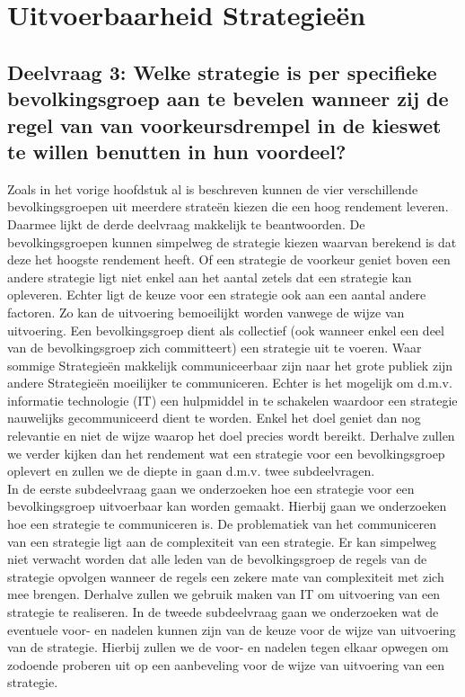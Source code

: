 \newpage
\section{Uitvoerbaarheid Strategie\"{e}n}
\label{h6}

\subsection*{Deelvraag 3: Welke strategie is per specifieke bevolkingsgroep aan te bevelen wanneer zij de regel van van voorkeursdrempel in de kieswet te willen benutten in hun voordeel?}
Zoals in het vorige hoofdstuk al is beschreven kunnen de vier verschillende bevolkingsgroepen uit meerdere strate\"{e}n kiezen die een hoog rendement leveren. Daarmee lijkt de derde deelvraag makkelijk te beantwoorden. De bevolkingsgroepen kunnen simpelweg de strategie kiezen waarvan berekend is dat deze het hoogste rendement heeft. Of een strategie de voorkeur geniet boven een andere strategie ligt niet enkel aan het aantal zetels dat een strategie kan opleveren. Echter ligt de keuze voor een strategie ook aan een aantal andere factoren. Zo kan de uitvoering bemoeilijkt worden vanwege de wijze van uitvoering. Een bevolkingsgroep dient als collectief (ook wanneer enkel een deel van de bevolkingsgroep zich committeert) een strategie uit te voeren. Waar sommige Strategie\"{e}n makkelijk communiceerbaar zijn naar het grote publiek zijn andere Strategie\"{e}n moeilijker te communiceren. Echter is het mogelijk om d.m.v. informatie technologie (IT) een hulpmiddel in te schakelen waardoor een strategie nauwelijks gecommuniceerd dient te worden. Enkel het doel geniet dan nog relevantie en niet de wijze waarop het doel precies wordt bereikt. Derhalve zullen we verder kijken dan het rendement wat een strategie voor een bevolkingsgroep oplevert en zullen we de diepte in gaan d.m.v. twee subdeelvragen. \\
\indent In de eerste subdeelvraag gaan we onderzoeken hoe een strategie voor een bevolkingsgroep uitvoerbaar kan worden gemaakt. Hierbij gaan we onderzoeken hoe een strategie te communiceren is. De problematiek van het communiceren van een strategie ligt aan de complexiteit van een strategie. Er kan simpelweg niet verwacht worden dat alle leden van de bevolkingsgroep de regels van de strategie opvolgen wanneer de regels een zekere mate van complexiteit met zich mee brengen. Derhalve zullen we gebruik maken van IT om uitvoering van een strategie te realiseren. In de tweede subdeelvraag gaan we onderzoeken wat de eventuele voor- en nadelen kunnen zijn van de keuze voor de wijze van uitvoering van de strategie. Hierbij zullen we de voor- en nadelen tegen elkaar opwegen om zodoende proberen uit op een aanbeveling voor de wijze van uitvoering van een strategie.  



